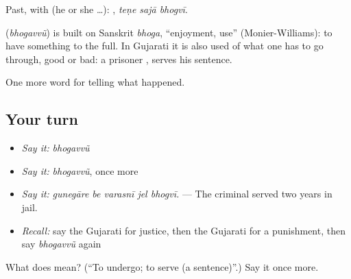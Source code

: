 Past, with  (he or she …):   , \emph{teṇe sajā bhogvī}.

\begin{cousinweb}
\textbf{} (\emph{bhogavvũ}) is built on Sanskrit \emph{bhoga}, \textquotedblleft{}enjoyment, use\textquotedblright{} (Monier-Williams): to have something to the full. In Gujarati it is also used of what one has to go through, good or bad: a prisoner \textbf{  }, serves his sentence.
\end{cousinweb}

\begin{grammarlens}[title={What you've built}]
One more word for telling what happened.
\end{grammarlens}

\subsection*{Your turn}
\begin{itemize}
\raggedright
  \item \emph{Say it:} \emph{bhogavvũ}
  \item \emph{Say it:} \emph{bhogavvũ}, once more
  \item \emph{Say it:} \emph{gunegāre be varasnī jel bhogvī.} — The criminal served two years in jail.
  \item \emph{Recall:} say the Gujarati for justice, then the Gujarati for a punishment, then say \emph{bhogavvũ} again
\end{itemize}

\begin{tcolorbox}[breakable,colback=teal!4,colframe=teal!35!black,title={Before you move on}]
What does  mean? (\textquotedblleft{}To undergo; to serve (a sentence)\textquotedblright{}.) Say it once more.
\end{tcolorbox}
